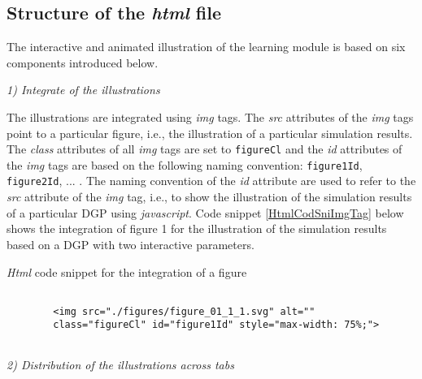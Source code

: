 \documentclass[12pt]{article}
\begin{document}

\subsection{Structure of the \emph{html} file}\label{SecHowHtm}

The interactive and animated illustration of the learning module is based on six components introduced below.


\vspace{1em}
\noindent\emph{1) Integrate of the illustrations}

The illustrations are integrated using \emph{img} tags. 
%
The \emph{src} attributes of the \emph{img} tags point to a particular figure, i.e., the illustration of a particular simulation results. 
%
The \emph{class} attributes of all \emph{img} tags are set to \texttt{figureCl} and the \emph{id} attributes of the \emph{img} tags are based on the following naming convention: \texttt{figure1Id}, \texttt{figure2Id}, ... . 
%
The naming convention of the \emph{id} attribute are used to refer to the \emph{src} attribute of the \emph{img} tag, i.e., to show the illustration of the simulation results of a particular DGP using \emph{javascript}. 
%
Code snippet \ref{HtmlCodSniImgTag} below shows the integration of figure 1 for the illustration of the simulation results based on a DGP with two interactive parameters. 
%
\begin{CodeSnippet}[!hp]
	\centering
	\caption{\emph{Html} code snippet for the integration of a figure}
	\footnotesize
	\vspace{0.25cm}
	\begin{BVerbatim}
		
		<img src="./figures/figure_01_1_1.svg" alt=""
		class="figureCl" id="figure1Id" style="max-width: 75%
		
	\end{BVerbatim}
	\label{HtmlCodSniImgTag}
\end{CodeSnippet}


\vspace{1em}
\noindent\emph{2) Distribution of the illustrations across tabs}
\end{document}
